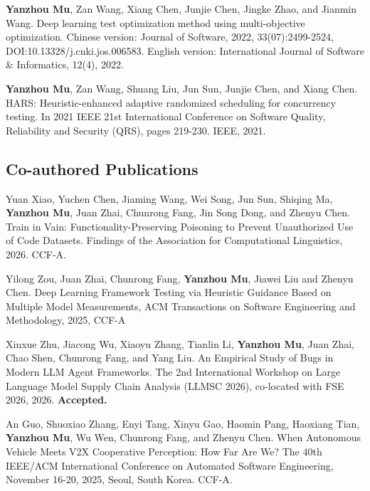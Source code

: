\documentclass[a4paper,11pt]{article}
\begin{document}
    \vspace{2mm}
    \item {\textbf{Yanzhou Mu}, Zan Wang, Xiang Chen, Junjie Chen, Jingke Zhao, and Jianmin Wang. Deep learning test optimization method using multi-objective optimization. Chinese version: Journal of Software, 2022, 33(07):2499-2524, DOI:10.13328/j.cnki.jos.006583. English version: International Journal of Software \& Informatics, 12(4), 2022.}

    \vspace{2mm}
    \item {\textbf{Yanzhou Mu}, Zan Wang, Shuang Liu, Jun Sun, Junjie Chen, and Xiang Chen. HARS: Heuristic-enhanced adaptive randomized scheduling for concurrency testing. In 2021 IEEE 21st International Conference on Software Quality, Reliability and Security (QRS), pages 219-230. IEEE, 2021.}

    \vspace{2mm}
    \subsection{\textbf{Co-authored Publications}}
    \item {Yuan Xiao, Yuchen Chen, Jiaming Wang, Wei Song, Jun Sun, Shiqing Ma, \textbf{Yanzhou Mu}, Juan Zhai, Chunrong Fang, Jin Song Dong, and Zhenyu Chen. Train in Vain: Functionality-Preserving Poisoning to Prevent Unauthorized Use of Code Datasets. Findings of the Association for Computational Linguistics, 2026. CCF-A.}


    \vspace{2mm}
    \item {Yilong Zou, Juan Zhai, Chunrong Fang, \textbf{Yanzhou Mu}, Jiawei Liu and Zhenyu Chen. Deep Learning Framework Testing via Heuristic Guidance Based on Multiple Model Measurements, ACM Transactions on Software Engineering and Methodology, 2025, CCF-A}

    \vspace{2mm}
    \item {Xinxue Zhu, Jiacong Wu, Xiaoyu Zhang, Tianlin Li, \textbf{Yanzhou Mu}, Juan Zhai, Chao Shen, Chunrong Fang, and Yang Liu. An Empirical Study of Bugs in Modern LLM Agent Frameworks. The 2nd International Workshop on Large Language Model Supply Chain Analysis (LLMSC 2026), co-located with FSE 2026, 2026. \textbf{Accepted.}}
    
    \vspace{2mm}
    \item {An Guo, Shuoxiao Zhang, Enyi Tang, Xinyu Gao, Haomin Pang, Haoxiang Tian, \textbf{Yanzhou Mu}, Wu Wen, Chunrong Fang, and Zhenyu Chen. When Autonomous Vehicle Meets V2X Cooperative Perception: How Far Are We? The 40th IEEE/ACM International Conference on Automated Software Engineering, November 16-20, 2025, Seoul, South Korea. CCF-A.}
\end{document}
